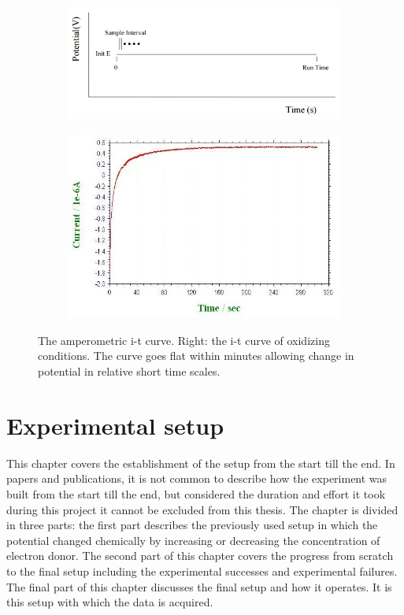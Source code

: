 \documentclass[twoside,single]{lion-msc}
\begin{document}
\begin{figure}[ht!]
\begin{subfigure}{.5\textwidth}
  \centering
  \includegraphics[width= \textwidth]{amp_curve}

  \label{}
\end{subfigure}%
\begin{subfigure}{.5\textwidth}
  \centering
  \includegraphics[width=.95 \linewidth]{it100mV}
  \label{}
\end{subfigure}
\caption{The amperometric i-t curve.  Right: the i-t curve of oxidizing conditions. The curve goes flat within minutes allowing change in potential in relative short time scales.}
\label{amp_curve}
\end{figure}



\chapter{Experimental setup}

This chapter covers the establishment of the setup from the start till the end. In papers and publications, it is not  common to describe how the experiment was built from the start till the end, but considered the duration and effort it took during this project it cannot be excluded from this thesis. The chapter is divided in three parts: the first part describes the previously used setup in which the potential changed chemically by increasing or decreasing the concentration of  electron donor. The second part of this chapter covers the progress from scratch to the final setup including the experimental successes and experimental failures. The final part of this chapter discusses the final setup and how it operates. It is this setup with which the data is acquired.
\end{document}
